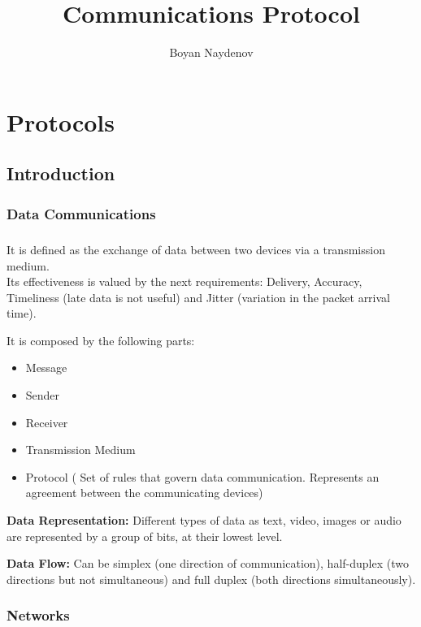 \documentclass[12pt,a4paper]{report}
\author{Boyan Naydenov}
\title{Communications Protocol}
\begin{document}
\maketitle

\chapter{Protocols}
\section{Introduction}
\subsection{Data Communications}
\paragraph{}

It is defined as the exchange of data between two devices via a transmission medium.\\

Its effectiveness is valued by the next requirements: Delivery, Accuracy, Timeliness (late data is not useful) and Jitter (variation in the packet arrival time).\newline

It is composed by the following parts:

\begin{itemize}
\item Message
\item Sender
\item Receiver
\item Transmission Medium
\item Protocol ( Set of rules that govern data communication. Represents an agreement between the communicating devices)
\end{itemize}

\textbf{Data Representation: }Different types of data as text, video, images or audio are represented by a group of bits, at their lowest level.
\newline

\textbf{Data Flow:} Can be simplex (one direction of communication), half-duplex (two directions but not simultaneous) and full duplex (both directions simultaneously).

\subsection{Networks}
\end{document}
